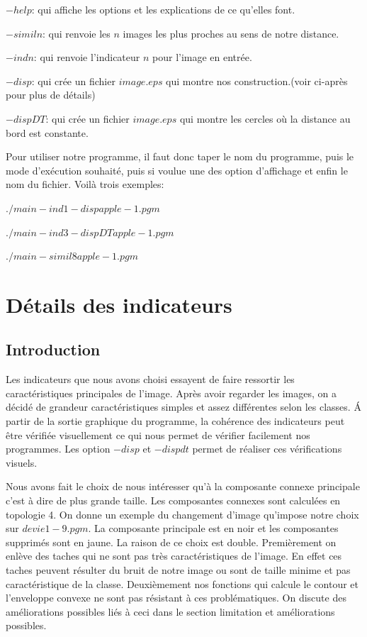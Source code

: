 \documentclass{report}
\begin{document}
\noindent$-help$: qui affiche les options et les explications de ce qu'elles font.

\noindent$-simil n$: qui renvoie les $n$ images les plus proches au sens de notre distance.

\noindent$-indn$: qui renvoie l'indicateur $n$ pour l'image en entrée.

\noindent$-disp$: qui crée un fichier $image.eps$ qui montre nos construction.(voir ci-après pour plus de  détails)

\noindent$-dispDT$: qui crée un fichier $image.eps$ qui montre les cercles où la distance au bord est constante.

Pour utiliser notre programme, il faut donc taper le nom du programme, puis le mode d'exécution souhaité, puis si voulue une des option d'affichage et enfin le nom du fichier. Voilà trois exemples:

\noindent $./main -ind1 -disp apple-1.pgm$

\noindent $./main -ind3 -dispDT apple-1.pgm$

\noindent $./main -simil 8 apple-1.pgm$
\chapter{Détails des indicateurs}
\section*{Introduction}
Les indicateurs que nous avons choisi essayent de faire ressortir les caractéristiques principales de l'image.
Après avoir regarder les images, on a décidé de grandeur caractéristiques simples et assez différentes selon les classes.
\'A partir de la sortie graphique du programme, la cohérence des indicateurs peut être vérifiée visuellement ce 
qui nous permet de vérifier facilement nos programmes. 
Les option $-disp$ et $-dispdt$ permet de réaliser ces vérifications visuels.

Nous avons fait le choix de nous intéresser qu'à la composante connexe principale c'est à dire de plus grande taille.
Les composantes connexes sont calculées en topologie 4.
On donne un exemple du changement d'image qu'impose notre choix sur $devie1-9.pgm$.
La composante principale est en noir et les composantes supprimés sont en jaune.
La raison de ce choix est double.
Premièrement on enlève des taches qui ne sont pas très caractéristiques de l'image. 
En effet ces taches peuvent résulter du bruit de notre image ou sont de taille minime et pas caractéristique de la classe.
Deuxièmement nos fonctions qui calcule le contour et l'enveloppe convexe ne sont pas résistant à ces problématiques.
On discute des améliorations possibles liés à ceci dans le section limitation et améliorations possibles.
\end{document}
